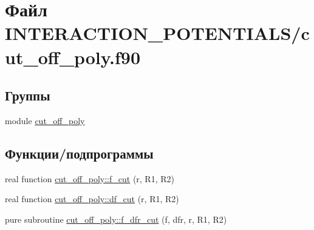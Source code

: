 \hypertarget{cut__off__poly_8f90}{}\section{Файл I\+N\+T\+E\+R\+A\+C\+T\+I\+O\+N\+\_\+\+P\+O\+T\+E\+N\+T\+I\+A\+L\+S/cut\+\_\+off\+\_\+poly.f90}
\label{cut__off__poly_8f90}
\subsection*{Группы}
\begin{DoxyCompactItemize}
\item 
module \mbox{\hyperlink{namespacecut__off__poly}{cut\+\_\+off\+\_\+poly}}
\end{DoxyCompactItemize}
\subsection*{Функции/подпрограммы}
\begin{DoxyCompactItemize}
\item 
real function \mbox{\hyperlink{namespacecut__off__poly_a86929565d0a548608692680a8cd98cdc}{cut\+\_\+off\+\_\+poly\+::f\+\_\+cut}} (r, R1, R2)
\item 
real function \mbox{\hyperlink{namespacecut__off__poly_a5c318e9af5df6d48494b93a14ac45f00}{cut\+\_\+off\+\_\+poly\+::df\+\_\+cut}} (r, R1, R2)
\item 
pure subroutine \mbox{\hyperlink{namespacecut__off__poly_aa06a8a5bc68fa128e1a5bb543fce787b}{cut\+\_\+off\+\_\+poly\+::f\+\_\+dfr\+\_\+cut}} (f, dfr, r, R1, R2)
\end{DoxyCompactItemize}
